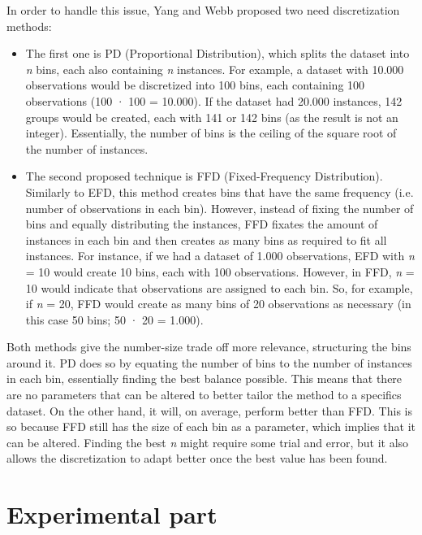 \documentclass{article}
\begin{document}
In order to handle this issue, Yang and Webb proposed two need discretization methods: 
\begin{itemize} 
    \item The first one is PD (Proportional Distribution), which splits the dataset into \emph{n} bins, each also containing  \emph{n} instances. For example, a dataset with 10.000 observations would be discretized into 100 bins, each containing 100 observations (100 · 100 = 10.000). If the dataset had 20.000 instances, 142 groups would be created, each with 141 or 142 bins (as the result is not an integer). Essentially, the number of bins is the ceiling of the square root of the number of instances. 
    \item The second proposed technique is FFD (Fixed-Frequency Distribution). Similarly to EFD, this method creates bins that have the same frequency (i.e. number of observations in each bin). However, instead of fixing the number of bins and equally distributing the instances, FFD fixates the amount of instances in each bin and then creates as many bins as required to fit all instances. For instance, if we had a dataset of 1.000 observations, EFD with \emph{n} = 10 would create 10 bins, each with 100 observations. However, in FFD, \emph{n} = 10 would indicate that  observations are assigned to each bin. So, for example, if \emph{n} = 20, FFD would create as many bins of 20 observations as necessary (in this case 50 bins; 50 · 20 = 1.000).
\end{itemize}

Both methods give the number-size trade off more relevance, structuring the bins around it. PD does so by equating the number of bins to the number of instances in each bin, essentially finding the best balance possible. This means that there are no parameters that can be altered to better tailor the method to a specifics dataset. On the other hand, it will, on average, perform better than FFD. This is so because FFD still has the size of each bin as a parameter, which implies that it can be altered. Finding the best \emph{n} might require some trial and error, but it also allows the discretization to adapt better once the best value has been found.

\section{Experimental part}
\end{document}

